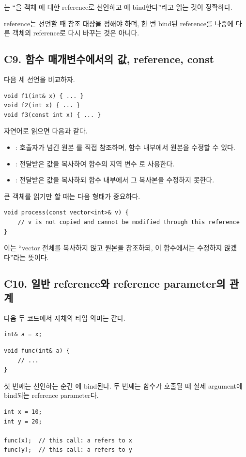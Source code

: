 \begin{keybox}[reference 선언 읽기]
는 ``을  객체 에 대한 reference로 선언하고 에 bind한다''라고 읽는 것이 정확하다.
\end{keybox}

reference는 선언할 때 참조 대상을 정해야 하며, 한 번 bind된 reference를 나중에 다른 객체의 reference로 다시 바꾸는 것은 아니다.

\subsection{C9. 함수 매개변수에서의 값, reference, const}
다음 세 선언을 비교하자.
\begin{lstlisting}
void f1(int& x) { ... }
void f2(int x) { ... }
void f3(const int x) { ... }
\end{lstlisting}

자연어로 읽으면 다음과 같다.
\begin{itemize}
  \item {}: 호출자가 넘긴 원본 를 직접 참조하며, 함수 내부에서 원본을 수정할 수 있다.
  \item {}: 전달받은 값을 복사하여 함수의 지역 변수 로 사용한다.
  \item {}: 전달받은 값을 복사하되 함수 내부에서 그 복사본을 수정하지 못한다.
\end{itemize}

큰 객체를 읽기만 할 때는 다음 형태가 중요하다.
\begin{lstlisting}
void process(const vector<int>& v) {
    // v is not copied and cannot be modified through this reference
}
\end{lstlisting}

이는 ``vector 전체를 복사하지 않고 원본을 참조하되, 이 함수에서는 수정하지 않겠다''라는 뜻이다.

\subsection{C10. 일반 reference와 reference parameter의 관계}
다음 두 코드에서  자체의 타입 의미는 같다.
\begin{lstlisting}
int& a = x;
\end{lstlisting}
\begin{lstlisting}
void func(int& a) {
    // ...
}
\end{lstlisting}

첫 번째는 선언하는 순간 에 bind된다. 두 번째는 함수가 호출될 때 실제 argument에 bind되는 reference parameter다.
\begin{lstlisting}
int x = 10;
int y = 20;

func(x);  // this call: a refers to x
func(y);  // this call: a refers to y
\end{lstlisting}

